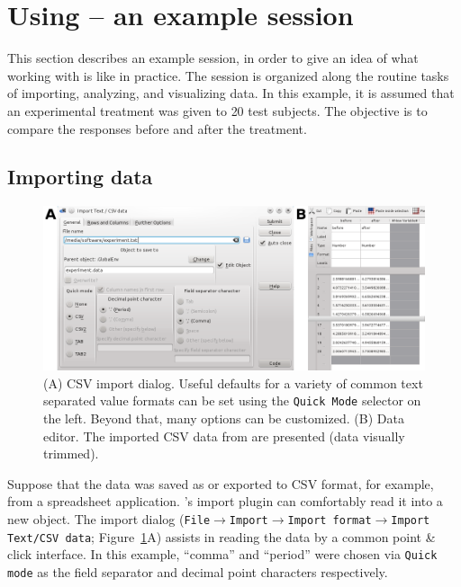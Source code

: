 \section[Using RKWard -- an example session]{Using  -- an example session}
\label{sec:using_RKWard}
This section describes an example  session, in order to give an idea
of what working with  is like in practice.
The session is organized along the routine tasks of importing,
analyzing, and visualizing data. In this example, it is assumed that an experimental
treatment was given to 20 test subjects. The objective is to compare the responses 
before and after the treatment. 

\subsection{Importing data}
\label{sec:importing_data}
\begin{figure}[b!]
 \centering
 \includegraphics[width=13.5cm]{./figures/import_data.png}
 \caption{(A) CSV import dialog. Useful defaults for a variety of common text separated value formats can
  be set using the \texttt{Quick Mode} selector on the left. Beyond that, many options can be customized. (B) Data editor. The imported CSV
  data from  are presented (data visually trimmed).}
 \label{fig:import_data}
\end{figure}

Suppose that the data was saved as or exported to CSV format, for example, from a 
spreadsheet application. 's import plugin can
comfortably read it into a new  object.
The import dialog (\texttt{File$\rightarrow$Import$\rightarrow$Import
format$\rightarrow$Import Text/CSV data}; Figure~\ref{fig:import_data}A) assists in reading the
data by a common point \& click interface. In this
example, ``comma'' and ``period'' were chosen via \texttt{Quick mode} as the field
separator and decimal point characters respectively.

